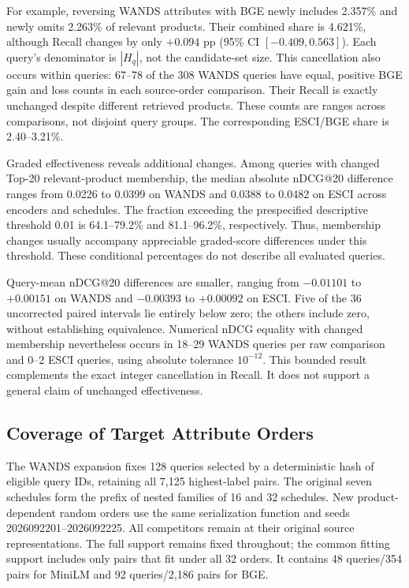 For example, reversing WANDS attributes with BGE newly includes 2.357\% and newly omits 2.263\% of relevant products. Their combined share is 4.621\%, although Recall changes by only $+0.094$ pp (95\% CI $[-0.409,0.563]$). Each query's denominator is $|H_q|$, not the candidate-set size. This cancellation also occurs within queries: 67--78 of the 308 WANDS queries have equal, positive BGE gain and loss counts in each source-order comparison. Their Recall is exactly unchanged despite different retrieved products. These counts are ranges across comparisons, not disjoint query groups. The corresponding ESCI/BGE share is 2.40--3.21\%.

Graded effectiveness reveals additional changes. Among queries with changed Top-20 relevant-product membership, the median absolute nDCG@20 difference ranges from 0.0226 to 0.0399 on WANDS and 0.0388 to 0.0482 on ESCI across encoders and schedules. The fraction exceeding the prespecified descriptive threshold 0.01 is 64.1--79.2\% and 81.1--96.2\%, respectively. Thus, membership changes usually accompany appreciable graded-score differences under this threshold. These conditional percentages do not describe all evaluated queries.

Query-mean nDCG@20 differences are smaller, ranging from $-0.01101$ to $+0.00151$ on WANDS and $-0.00393$ to $+0.00092$ on ESCI. Five of the 36 uncorrected paired intervals lie entirely below zero; the others include zero, without establishing equivalence. Numerical nDCG equality with changed membership nevertheless occurs in 18--29 WANDS queries per raw comparison and 0--2 ESCI queries, using absolute tolerance $10^{-12}$. This bounded result complements the exact integer cancellation in Recall. It does not support a general claim of unchanged effectiveness.




\subsection{Coverage of Target Attribute Orders}
\label{app:ch6_coverage}

The WANDS expansion fixes 128 queries selected by a deterministic hash of eligible query IDs, retaining all 7,125 highest-label pairs. The original seven schedules form the prefix of nested families of 16 and 32 schedules. New product-dependent random orders use the same serialization function and seeds 2026092201--2026092225. All competitors remain at their original source representations. The full support remains fixed throughout; the common fitting support includes only pairs that fit under all 32 orders. It contains 48 queries/354 pairs for MiniLM and 92 queries/2,186 pairs for BGE.

